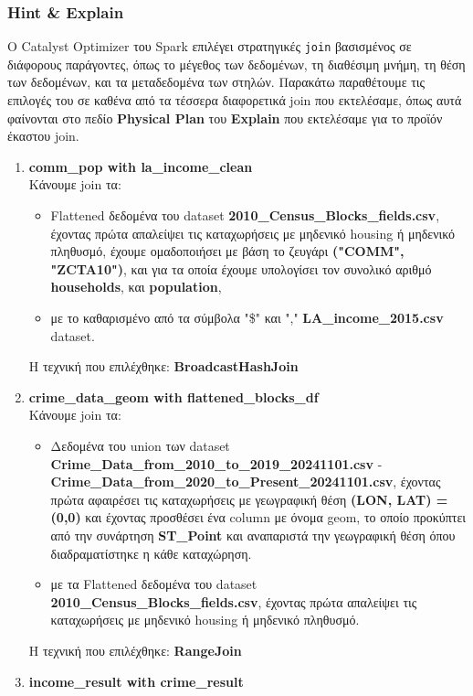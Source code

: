\documentclass{article}
\begin{document}
\subsubsection*{Hint \& Explain}
Ο Catalyst Optimizer του Spark επιλέγει στρατηγικές \texttt{join} βασισμένος σε διάφορους παράγοντες, όπως το μέγεθος των δεδομένων, τη διαθέσιμη μνήμη, τη θέση των δεδομένων, και τα μεταδεδομένα των στηλών. Παρακάτω παραθέτουμε τις επιλογές του σε καθένα από τα τέσσερα διαφορετικά join που εκτελέσαμε, όπως αυτά φαίνονται στο πεδίο \textbf{Physical Plan} του \textbf{Explain} που εκτελέσαμε για το προϊόν έκαστου join. 
\begin{enumerate}
\item \textbf{comm\_pop with la\_income\_clean} \\ 
Κάνουμε join τα:
\begin{itemize}
	\item Flattened δεδομένα του dataset \textbf{2010\_Census\_Blocks\_fields.csv}, έχοντας πρώτα απαλείψει τις καταχωρήσεις με μηδενικό housing ή μηδενικό πληθυσμό, έχουμε ομαδοποιήσει με βάση το ζευγάρι \textbf{("COMM", "ZCTA10")}, και για τα οποία έχουμε υπολογίσει τον συνολικό αριθμό \textbf{households}, και \textbf{population}, 
	\item με το καθαρισμένο από τα σύμβολα "\$" και "," \textbf{LA\_income\_2015.csv} dataset. 
\end{itemize}
Η τεχνική που επιλέχθηκε: \textbf{BroadcastHashJoin} 
\item \textbf{crime\_data\_geom with flattened\_blocks\_df} \\ 
Κάνουμε join τα:
\begin{itemize}
	\item Δεδομένα του union των dataset \textbf{Crime\_Data\_from\_2010\_to\_2019\_20241101.csv} - \\ \textbf{Crime\_Data\_from\_2020\_to\_Present\_20241101.csv}, έχοντας πρώτα αφαιρέσει τις καταχωρήσεις με γεωγραφική θέση \textbf{(LON, LAT) = (0,0)} και έχοντας προσθέσει ένα column με όνομα geom, το οποίο προκύπτει από την συνάρτηση \textbf{ST\_Point} και αναπαριστά την γεωγραφική θέση όπου διαδραματίστηκε η κάθε καταχώρηση. 
	\item με τα Flattened  δεδομένα του dataset \textbf{2010\_Census\_Blocks\_fields.csv}, έχοντας πρώτα απαλείψει τις καταχωρήσεις με μηδενικό housing ή μηδενικό πληθυσμό.
\end{itemize}
Η τεχνική που επιλέχθηκε: \textbf{RangeJoin}
\item \textbf{income\_result with crime\_result} \\

\end{enumerate}
\end{document}
